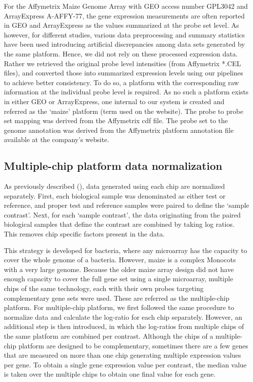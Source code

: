For the Affymetrix Maize Genome Array with GEO access number
GPL3042 and ArrayExpress A-AFFY-77, the gene expression
measurements are often reported in GEO and ArrayExpress as the
values summarized at the probe set level.  
As however, for different studies, various data preprocessing and summary
statistics have been used introducing artificial discrepancies among data sets 
generated by the same platform.  
Hence, we did not rely on these processed expression data. 
Rather we retrieved the original probe level intensities (from Affymetrix *.CEL 
files), and converted those into summarized expression levels using our 
pipelines to achieve better consistency.
To do so, a platform with the corresponding raw information at the individual 
probe level is required.
As no such a platform exists in either GEO or ArrayExpress, one internal to our 
system is created and referred as the ‘maize’ platform (term used on the 
website).  
The probe to probe set mapping was derived from the Affymetrix cdf file. The 
probe set to the genome annotation was derived from the Affymetrix platform 
annotation file available at the company’s website.


\subsection{Multiple-chip platform data normalization}

As previously described (\cite{Engelen2011}), data generated using each chip 
are normalized separately. 
First, each biological sample was denominated as either test or reference, and 
proper test and reference samples were paired to define the ‘sample contrast’. 
Next, for each ‘sample contrast’, the data originating from the paired 
biological samples that define the contrast are combined by taking log ratios. 
This removes chip specific factors present in the data.

This strategy is developed for bacteria, where any microarray has the capacity 
to cover the whole genome of a bacteria. 
%
However, maize is a complex Monocots with a very large genome.
%
Because the older maize array design did not have enough capacity
to cover the full gene set using a single microarray, multiple
chips of the same technology, each with their own probes
targeting complementary gene sets were used. 
These are referred as the multiple-chip platform.
%
For multiple-chip platform, we first followed the same procedure to normalize 
data and calculate the log-ratio for each chip separately. 
However, an additional step is then introduced, in which the log-ratios from 
multiple chips of the same platform are combined per contrast.
Although the chips of a multiple-chip platform are designed to be 
complementary, sometimes there are a few genes that are measured on more than 
one chip generating multiple expression values per gene. 
To obtain a single gene expression value per contrast, the median value is
taken over the multiple chips to obtain one final value for each gene.


